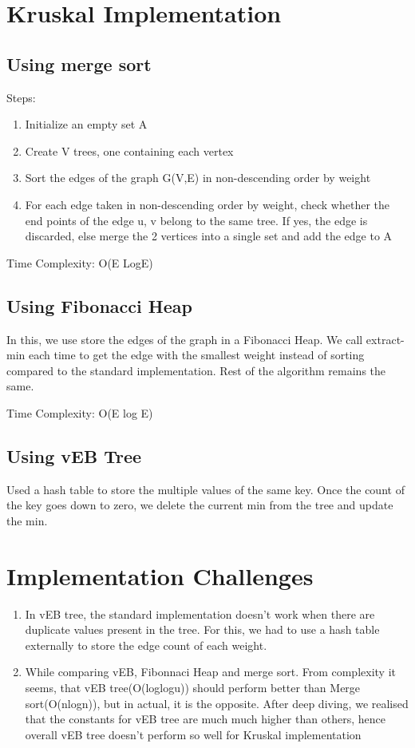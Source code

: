 \documentclass{article}
\begin{document}
\section{Kruskal Implementation}
\subsection{Using merge sort}
Steps:
\begin{enumerate}
\item Initialize an empty set A
\item Create V trees, one containing each vertex
\item Sort the edges of the graph G(V,E) in non-descending order by weight
\item For each edge taken in non-descending order by weight, check whether the end points of the edge u, v belong to the same tree. If yes, the edge is discarded, else merge the 2 vertices into a single set and add the edge to A
\end{enumerate}
Time Complexity: O(E LogE)

\subsection{Using Fibonacci Heap}
In this, we use store the edges of the graph in a Fibonacci Heap. We call extract-min each time to get the edge with the smallest weight instead of sorting compared to the standard implementation. Rest of the algorithm remains the same.

Time Complexity: O(E log E)

\subsection{Using vEB Tree}
Used a hash table to store the multiple values of the same key. Once the count of the key goes down to zero, we delete the current min from the tree and update the min.

\section{Implementation Challenges}
\begin{enumerate}
\item In vEB tree, the standard implementation doesn't work when there are duplicate values present in the tree. For this, we had to use a hash table externally to store the edge count of each weight.
\item While comparing vEB, Fibonnaci Heap and merge sort. From complexity it seems, that vEB tree(O(loglogu)) should perform better than Merge sort(O(nlogn)), but in actual, it is the opposite. After deep diving, we realised that the constants for vEB tree are much much higher than others, hence overall vEB tree doesn't perform so well for Kruskal implementation

\end{enumerate}
\end{document}
